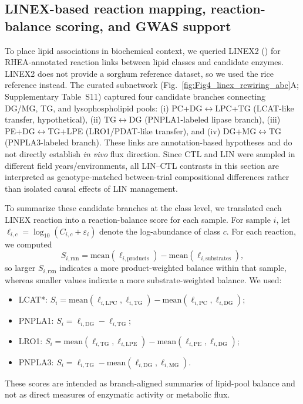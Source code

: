 \documentclass[9pt,twocolumn,twoside]{rilabRxiv}
\begin{document}
\subsection*{LINEX-based reaction mapping, reaction-balance scoring, and GWAS support}

To place lipid associations in biochemical context, we queried LINEX2 (\cite{Morgat2016Rhea}) for RHEA-annotated reaction links between lipid classes and candidate enzymes. LINEX2 does not provide a sorghum reference dataset, so we used the rice reference instead. The curated subnetwork (Fig.~\ref{fig:Fig4_linex_rewiring_abc}A; Supplementary Table~S11) captured four candidate branches connecting DG/MG, TG, and lysophospholipid pools: (i) PC+DG$\leftrightarrow$LPC+TG (LCAT-like transfer, hypothetical), (ii) TG$\leftrightarrow$DG (PNPLA1-labeled lipase branch), (iii) PE+DG$\leftrightarrow$TG+LPE (LRO1/PDAT-like transfer), and (iv) DG+MG$\leftrightarrow$TG (PNPLA3-labeled branch). These links are annotation-based hypotheses and do not directly establish \emph{in vivo} flux direction. Since CTL and LIN were sampled in different field years/environments, all LIN--CTL contrasts in this section are interpreted as genotype-matched between-trial compositional differences rather than isolated causal effects of LIN management.

To summarize these candidate branches at the class level, we translated each LINEX reaction into a reaction-balance score for each sample. For sample \(i\), let \(\ell_{i,c}=\log_{10}(C_{i,c}+\varepsilon_i)\) denote the log-abundance of class \(c\). For each reaction, we computed
\[
S_{i,\mathrm{rxn}}=\mathrm{mean}(\ell_{i,\mathrm{products}})-\mathrm{mean}(\ell_{i,\mathrm{substrates}}),
\]
so larger \(S_{i,\mathrm{rxn}}\) indicates a more product-weighted balance within that sample, whereas smaller values indicate a more substrate-weighted balance. We used:
\begin{itemize}
\item LCAT*: \(S_i=\mathrm{mean}(\ell_{i,\mathrm{LPC}},\ell_{i,\mathrm{TG}})-\mathrm{mean}(\ell_{i,\mathrm{PC}},\ell_{i,\mathrm{DG}})\);
\item PNPLA1: \(S_i=\ell_{i,\mathrm{DG}}-\ell_{i,\mathrm{TG}}\);
\item LRO1: \(S_i=\mathrm{mean}(\ell_{i,\mathrm{TG}},\ell_{i,\mathrm{LPE}})-\mathrm{mean}(\ell_{i,\mathrm{PE}},\ell_{i,\mathrm{DG}})\);
\item PNPLA3: \(S_i=\ell_{i,\mathrm{TG}}-\mathrm{mean}(\ell_{i,\mathrm{DG}},\ell_{i,\mathrm{MG}})\).
\end{itemize}
These scores are intended as branch-aligned summaries of lipid-pool balance and not as direct measures of enzymatic activity or metabolic flux.
\end{document}
